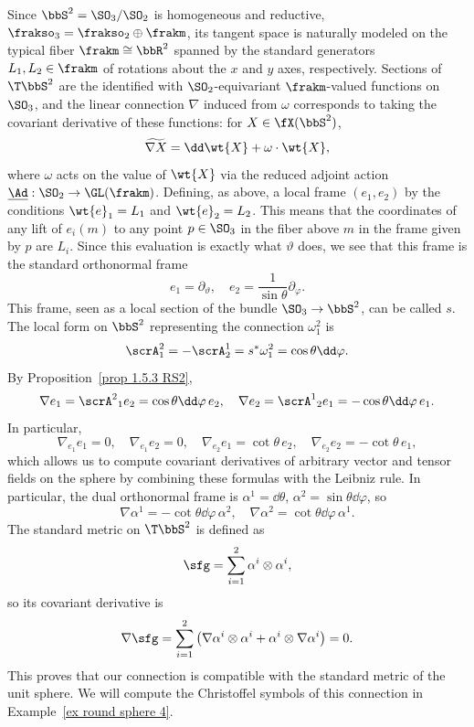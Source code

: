 \begin{example}\label{ex round sphere 3}
    Since $\bbS^2=\SO_3\slash\SO_2$ is homogeneous and reductive, $\frakso_3=\frakso_2\oplus\frakm$, its tangent space is naturally modeled on the typical fiber $\frakm\cong\bbR^2$ spanned by the standard generators $L_1,L_2\in\frakm$  of rotations about the $x$ and $y$ axes, respectively. Sections of $\T\bbS^2$ are the identified with $\SO_2$-equivariant $\frakm$-valued functions on $\SO_3$, and the linear connection $\nabla$ induced from $\omega$ corresponds to taking the covariant derivative of these functions: for $X\in\fX(\bbS^2)$,
    \[\widetilde{\nabla X}=\dd \wt{X}+\omega\cdot \wt{X},\]
    where $\omega$ acts on the value of $\wt{X}$ via the reduced adjoint action $\underline{\Ad}:\SO_2\to \GL(\frakm)$. Defining, as above, a local frame $(e_1,e_2)$ by the conditions $\wt{e}_1=L_1$ and $\wt{e}_2=L_2$. This means that the coordinates of any lift of $e_i(m)$ to any point $p\in \SO_3$ in the fiber above $m$ in the frame given by $p$ are $L_i$. Since this evaluation is exactly what $\vartheta$ does, we see that this frame is the standard orthonormal frame
    \[e_1=\partial_\vartheta,\quad e_2=\frac{1}{\sin\theta}\partial_{\varphi}.\]
    This frame, seen as a local section of the bundle $\SO_3\to \bbS^2$, can be called $s$. The local form on $\bbS^2$ representing the connection $\omega^2_1$ is 
    \[\scrA^2_1=-\scrA^1_2=s^\ast \omega^2_1=\cos\theta\dd\varphi.\]
    By Proposition~\ref{prop 1.5.3 RS2},
    \[\nabla e_1=\scrA^2{}_1e_2=\cos\theta\dd\varphi\, e_2,\quad \nabla e_2=\scrA^1{}_2e_1=-\cos\theta\dd\varphi\, e_1.\]
    In particular, 
    \[\nabla_{e_1}e_1=0,\quad \nabla_{e_1}e_2=0,\quad \nabla_{e_2}e_1=\cot\theta \,e_2, \quad \nabla_{e_2}e_2=-\cot\theta \,e_1,\label{eq nablas round sphere}\]
    which allows us to compute covariant derivatives of arbitrary vector and tensor fields on the sphere by combining these formulas with the Leibniz rule. In particular, the dual orthonormal frame is $\alpha^1=\dd\theta$, $\alpha^2=\sin\theta\dd\varphi$, so 
    \[\nabla \alpha^1=-\cot\theta\dd\varphi\,\alpha^2,\quad \nabla\alpha^2=\cot\theta\dd\varphi\,\alpha^1.\]
    The standard metric on $\T\bbS^2$ is defined as
    \[\sfg=\sum_{i=1}^2\alpha^i\otimes\alpha^i,\]
    so its covariant derivative is 
    \[\nabla\sfg=\sum_{i=1}^2 \left(\nabla \alpha^i\otimes\alpha^i+\alpha^i\otimes\nabla\alpha^i\right)=0.\]
    This proves that our connection is compatible with the standard metric of the unit sphere. We will compute the Christoffel symbols of this connection in Example~\ref{ex round sphere 4}.
\end{example}


